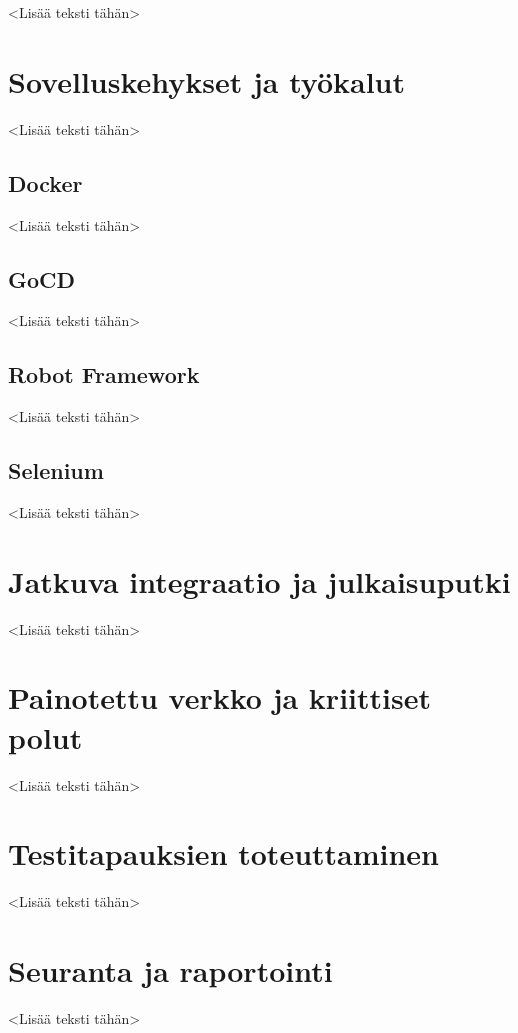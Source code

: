 <Lisää teksti tähän>

\section{Sovelluskehykset ja työkalut}

<Lisää teksti tähän>

\subsection{Docker}

<Lisää teksti tähän>

\subsection{GoCD}

<Lisää teksti tähän>

\subsection{Robot Framework}

<Lisää teksti tähän>

\subsection{Selenium}

<Lisää teksti tähän>

\section{Jatkuva integraatio ja julkaisuputki}

<Lisää teksti tähän>

\section{Painotettu verkko ja kriittiset polut}

<Lisää teksti tähän>

\section{Testitapauksien toteuttaminen}

<Lisää teksti tähän>

\section{Seuranta ja raportointi}

<Lisää teksti tähän>
